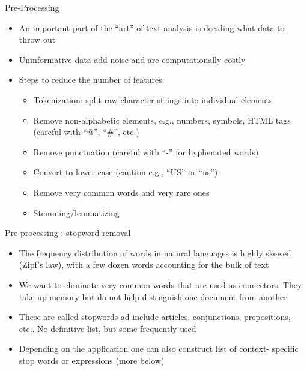 \documentclass[english]{beamer}
\begin{document}
\begin{frame}{Pre-Processing}

\begin{itemize}
\setlength{\itemsep}{0.8em}
\item An important part of the ``art'' of text analysis is deciding what data to throw out

\item Uninformative data add noise and are computationally costly

\pause

\item Steps to reduce the number of features:

\vspace{4pt}

\begin{itemize}
\setlength{\itemsep}{0.45em}
\item Tokenization: split raw character strings into individual elements 
\pause
\item Remove non-alphabetic elements, e.g., numbers, symbols, HTML tags (careful with ``@'', ``\#'', etc.)
\pause
\item Remove punctuation (careful with ``-'' for hyphenated words)
\pause
\item Convert to lower case (caution e.g., ``US'' or ``us'')
\pause
\item Remove very common words and very rare ones
\pause
\item Stemming/lemmatizing
\end{itemize}
\end{itemize}

\end{frame}

\begin{frame}{Pre-processing : stopword removal}
\begin{itemize}
\setlength{\itemsep}{1.2em}
\item The frequency distribution of words in natural languages is highly skewed (Zipf's law), with a few dozen words accounting for the bulk of text

\item We want to eliminate very common words that are used as connectors. They take up memory but do not help distinguish one document from another

\item These are called stopwords ad include articles, conjunctions, prepositions, etc.. No definitive list, but some frequently used

\pause

\item Depending on the application one can also construct list of context- specific stop words or expressions (more below)
\end{itemize}
\end{frame}
\end{document}

